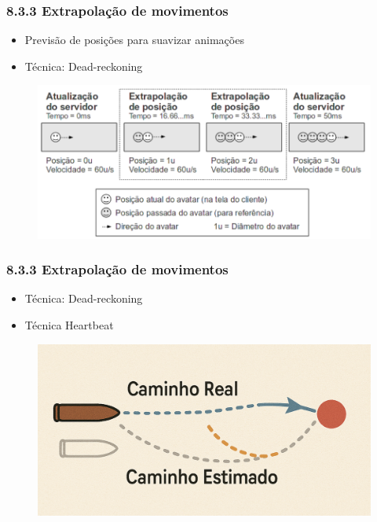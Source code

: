 \documentclass{beamer}
\begin{document}
\begin{frame}
  \frametitle{8.3.3 Extrapolação de movimentos}
  \begin{itemize}
    \item Previsão de posições para suavizar animações
    \item Técnica: Dead-reckoning
  \end{itemize}
  \begin{figure}[h]
    \centering
    \vspace{-18pt}
    \includegraphics[width=1.03\textwidth]{imagem_83.png}
    \vspace{-20pt}
  \end{figure}
\end{frame}

\begin{frame}
  \frametitle{8.3.3 Extrapolação de movimentos}
  \begin{itemize}
    \item Técnica: Dead-reckoning
    \item Técnica Heartbeat
  \end{itemize}
  \begin{figure}[h]
    \centering
    \vspace{-18pt}
    \includegraphics[width=1.03\textwidth]{imagem_83_nova.png}
    \vspace{-20pt}
  \end{figure}
\end{frame}
\end{document}
